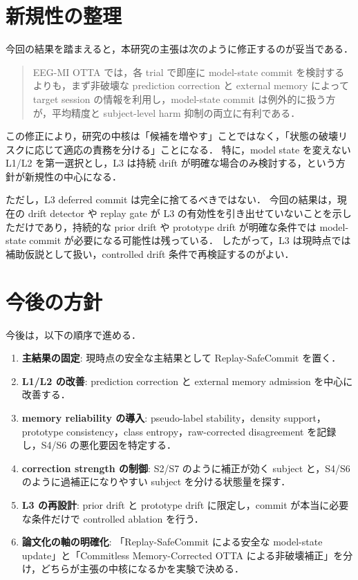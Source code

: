 \documentclass[a4paper,11pt]{ltjsarticle}
\begin{document}
\section{新規性の整理}

今回の結果を踏まえると，本研究の主張は次のように修正するのが妥当である．

\begin{quote}
EEG-MI OTTA では，各 trial で即座に model-state commit を検討するよりも，まず非破壊な prediction correction と external memory によって target session の情報を利用し，model-state commit は例外的に扱う方が，平均精度と subject-level harm 抑制の両立に有利である．
\end{quote}

この修正により，研究の中核は「候補を増やす」ことではなく，「状態の破壊リスクに応じて適応の責務を分ける」ことになる．
特に，model state を変えない L1/L2 を第一選択とし，L3 は持続 drift が明確な場合のみ検討する，という方針が新規性の中心になる．

ただし，L3 deferred commit は完全に捨てるべきではない．
今回の結果は，現在の drift detector や replay gate が L3 の有効性を引き出せていないことを示しただけであり，持続的な prior drift や prototype drift が明確な条件では model-state commit が必要になる可能性は残っている．
したがって，L3 は現時点では補助仮説として扱い，controlled drift 条件で再検証するのがよい．

\section{今後の方針}

今後は，以下の順序で進める．

\begin{enumerate}
  \item \textbf{主結果の固定}: 現時点の安全な主結果として Replay-SafeCommit を置く．
  \item \textbf{L1/L2 の改善}: prediction correction と external memory admission を中心に改善する．
  \item \textbf{memory reliability の導入}: pseudo-label stability，density support，prototype consistency，class entropy，raw-corrected disagreement を記録し，S4/S6 の悪化要因を特定する．
  \item \textbf{correction strength の制御}: S2/S7 のように補正が効く subject と，S4/S6 のように過補正になりやすい subject を分ける状態量を探す．
  \item \textbf{L3 の再設計}: prior drift と prototype drift に限定し，commit が本当に必要な条件だけで controlled ablation を行う．
  \item \textbf{論文化の軸の明確化}: 「Replay-SafeCommit による安全な model-state update」と「Commitless Memory-Corrected OTTA による非破壊補正」を分け，どちらが主張の中核になるかを実験で決める．
\end{enumerate}
\end{document}
